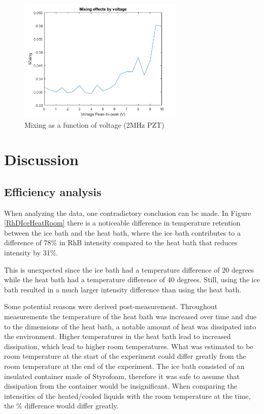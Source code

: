 \documentclass[twoside,twocolumn,9pt,a4paper]{IEEEtran}
\begin{document}
\begin{figure}[H]
\begin{center}
\includegraphics[width=7.9cm]{Images/Images from Jonte/Mixing effects by voltage.png} %
\caption{Mixing as a function of voltage (2MHz PZT)}
\label{Voltage}
\end{center}
\end{figure} %


\section{Discussion}

\subsection{Efficiency analysis}

When analyzing the data, one contradictory conclusion can be made. In Figure \ref{RhDIceHeatRoom} there is a noticeable difference in temperature retention between the ice bath and the heat bath, where the ice bath contributes to a difference of 78\%  in RhB intensity compared to the heat bath that reduces intensity by 31\%.

This is unexpected since the ice bath had a temperature difference of 20 degrees while the heat bath had a temperature difference of 40 degrees. Still, using the ice bath resulted in a much larger intensity difference than using the heat bath.  

Some potential reasons were derived post-measurement. Throughout measurements the temperature of the heat bath was increased over time and due to the dimensions of the heat bath, a notable amount of heat was dissipated into the environment. Higher temperatures in the heat bath lead to increased dissipation, which lead to higher room temperatures. What was estimated to be room temperature at the start of the experiment could differ greatly from the room temperature at the end of the experiment. The ice bath consisted of an insulated container made of Styrofoam, therefore it was safe to assume that dissipation from the container would be insignificant. When comparing the intensities of the heated/cooled liquids with the room temperature at the time, the \% difference would differ greatly.
\end{document}
